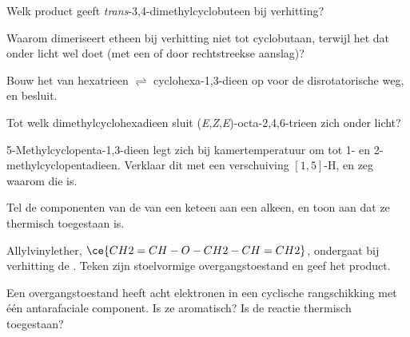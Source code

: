 \begin{exercise}[$\star$]\label{exo:b3:pericyclic:3}
Welk product geeft \textit{trans}-3,4-dimethylcyclobuteen bij verhitting?
\end{exercise}

\begin{exercise}[$\star$]\label{exo:b3:pericyclic:4}
Waarom dimeriseert etheen bij verhitting niet tot cyclobutaan, terwijl
het dat onder licht wel doet (met een  of door
rechtstreekse aanslag)?
\end{exercise}

\begin{exercise}[$\star\star$]\label{exo:b3:pericyclic:5}
Bouw het  van hexatrieen $\rightleftharpoons$ cyclohexa-1,3-dieen op voor de
disrotatorische weg, en besluit.
\end{exercise}

\begin{exercise}[$\star\star$]\label{exo:b3:pericyclic:6}
Tot welk dimethylcyclohexadieen sluit (\textit{E},\textit{Z},\textit{E})-octa-2,4,6-trieen zich onder licht?
\end{exercise}

\begin{exercise}[$\star\star$]\label{exo:b3:pericyclic:7}
5-Methylcyclopenta-1,3-dieen legt zich bij kamertemperatuur om tot 1- en
2-methylcyclopentadieen. Verklaar dit met een verschuiving $[1,5]$-H, en zeg waarom die  is.
\end{exercise}

\begin{exercise}[$\star\star$]\label{exo:b3:pericyclic:8}
Tel de componenten van de  van een keteen aan een alkeen, en
toon aan dat ze thermisch toegestaan is.
\end{exercise}

\begin{exercise}[$\star\star$]\label{exo:b3:pericyclic:9}
Allylvinylether, $\ce{CH2=CH-O-CH2-CH=CH2}$, ondergaat bij verhitting de .
Teken zijn stoelvormige overgangstoestand en geef het product.
\end{exercise}

\begin{exercise}[$\star\star\star$]\label{exo:b3:pericyclic:10}
Een overgangstoestand heeft acht elektronen in een cyclische
rangschikking met één antarafaciale component. Is ze aromatisch? Is de
reactie thermisch toegestaan?
\end{exercise}

